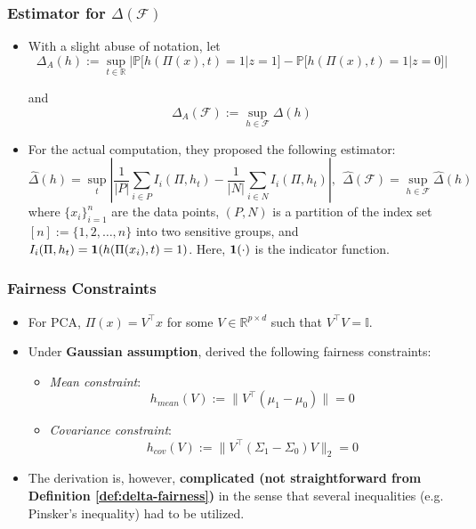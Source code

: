 \documentclass{beamer}
\begin{document}
	\begin{frame}
	\frametitle{Estimator for $\Delta(\mathcal{F})$}
	\begin{itemize}
		\item With a slight abuse of notation, let
		\begin{equation*}
			\Delta_A(h) := \sup_{t \in \mathbb{R}} \Big| \mathbb{P}\big[ h(\Pi(x), t) = 1 | z = 1 \big] - \mathbb{P}\big[ h(\Pi(x), t) = 1 | z = 0 \big] \Big|
		\end{equation*}
		
		and
		\begin{equation*}
			\Delta_A(\mathcal{F}) := \sup_{h \in \mathcal{F}} \Delta(h)
		\end{equation*}
		
		\item For the actual computation, they proposed the following estimator:
		\begin{equation*}
			\widehat{\Delta}(h) = \sup_t \left| \frac{1}{|P|} \sum_{i \in P} I_i(\Pi, h_t) - \frac{1}{|N|} \sum_{i \in N} I_i(\Pi, h_t) \right|, \ \ \widehat{\Delta}(\mathcal{F}) = \sup_{h \in \mathcal{F}} \widehat{\Delta}(h)
		\end{equation*}
		where $\{x_i\}_{i=1}^n$ are the data points, $(P, N)$ is a partition of the index set $[n] := \{1, 2, \dots, n\}$ into two sensitive groups, and $I_i(\Pi, h_t) = {\bf 1}(h(\Pi(x_i), t) = 1)$.
		Here, ${\bf 1}(\cdot)$ is the indicator function.
		
	\end{itemize}
	\end{frame}

	\begin{frame}
		\frametitle{Fairness Constraints}
		\begin{itemize}
			\item For PCA, $\Pi(x) = V^\intercal x$ for some $V \in \mathbb{R}^{p \times d}$ such that $V^\intercal V = \mathbb{I}$.
			
			\item Under {\bf\color{red} Gaussian assumption}, \cite{OA19} derived the following fairness constraints:
			\begin{itemize}
				\item {\it Mean constraint}:
				\begin{equation*}
					h_{mean}(V) := \lVert V^\intercal (\mu_1 - \mu_0) \rVert = 0
				\end{equation*}
	
				\item {\it Covariance constraint}:
				\begin{equation*}
					h_{cov}(V) := \lVert V^\intercal (\Sigma_1 - \Sigma_0) V \rVert_2 = 0
				\end{equation*}
			\end{itemize}
		
			\item The derivation is, however, {\bf\color{red} complicated (not straightforward from Definition \ref{def:delta-fairness})} in the sense that several inequalities (e.g. Pinsker's inequality) had to be utilized.
		\end{itemize}
	\end{frame}
\end{document}
